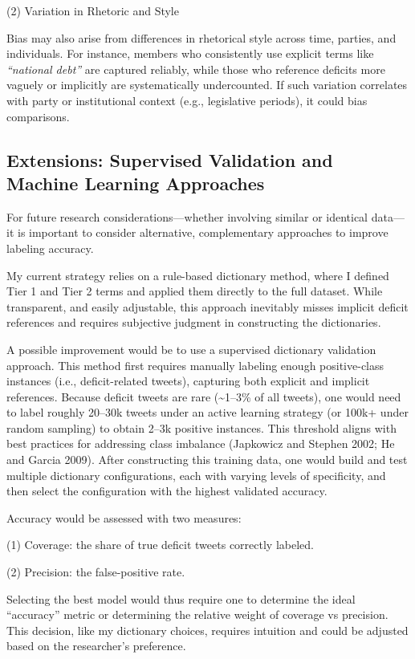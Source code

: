 \documentclass[
  12pt,
]{article}
\begin{document}
(2) Variation in Rhetoric and Style

Bias may also arise from differences in rhetorical style across time,
parties, and individuals. For instance, members who consistently use
explicit terms like \emph{``national debt''} are captured reliably,
while those who reference deficits more vaguely or implicitly are
systematically undercounted. If such variation correlates with party or
institutional context (e.g., legislative periods), it could bias
comparisons.

\subsection{Extensions: Supervised Validation and Machine Learning
Approaches}\label{extensions-supervised-validation-and-machine-learning-approaches}

For future research considerations---whether involving similar or
identical data---it is important to consider alternative, complementary
approaches to improve labeling accuracy.

My current strategy relies on a rule-based dictionary method, where I
defined Tier 1 and Tier 2 terms and applied them directly to the full
dataset. While transparent, and easily adjustable, this approach
inevitably misses implicit deficit references and requires subjective
judgment in constructing the dictionaries.

A possible improvement would be to use a supervised dictionary
validation approach. This method first requires manually labeling enough
positive-class instances (i.e., deficit-related tweets), capturing both
explicit and implicit references. Because deficit tweets are rare
(\textasciitilde1--3\% of all tweets), one would need to label roughly
20--30k tweets under an active learning strategy (or 100k+ under random
sampling) to obtain 2--3k positive instances. This threshold aligns with
best practices for addressing class imbalance (Japkowicz and Stephen
2002; He and Garcia 2009). After constructing this training data, one
would build and test multiple dictionary configurations, each with
varying levels of specificity, and then select the configuration with
the highest validated accuracy.

Accuracy would be assessed with two measures:

(1) Coverage: the share of true deficit tweets correctly labeled.

(2) Precision: the false-positive rate.

Selecting the best model would thus require one to determine the ideal
``accuracy'' metric or determining the relative weight of coverage vs
precision. This decision, like my dictionary choices, requires intuition
and could be adjusted based on the researcher's preference.
\end{document}
